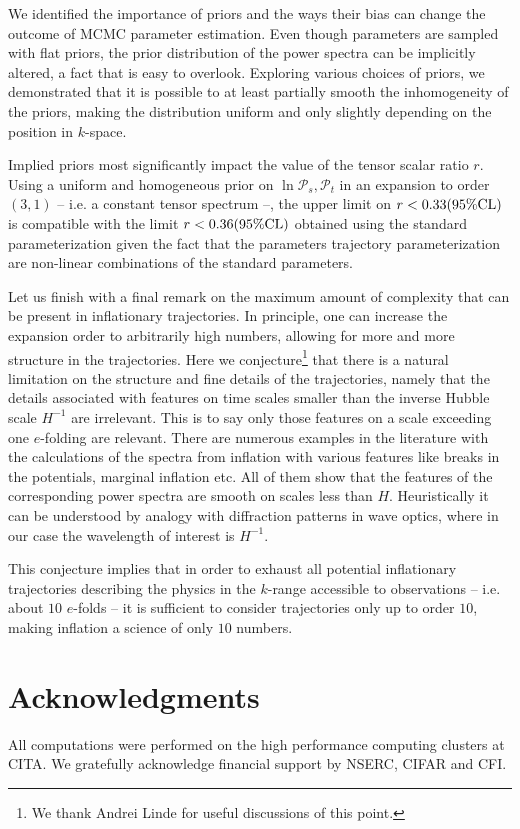 \documentclass[a4paper,11pt]{article}
\newcommand{\pscalar}{{\mathcal{P}_s}}
\newcommand{\ptensor}{{\mathcal{P}_t}}
\begin{document}
We identified the importance of priors and the ways their bias can
change the outcome of MCMC parameter estimation. Even though
parameters are sampled with flat priors, the prior distribution of the
power spectra can be implicitly altered, a fact that is easy to
overlook. Exploring various choices of priors, we demonstrated that it
is possible to at least partially smooth the inhomogeneity of the
priors, making the distribution uniform and only slightly depending on
the position in $k$-space.

Implied priors most significantly impact the value of the tensor
scalar ratio $r$. Using a uniform and homogeneous prior on
$\ln\pscalar, \ptensor $ in an expansion to order $(3,1)$ --
i.e. a constant tensor spectrum --, the upper limit on
$r<0.33(95\%{\rm CL})$ is compatible with the limit $r<0.36(95\%{\rm CL})$
obtained using the standard parameterization given the fact that the
parameters trajectory parameterization are non-linear combinations of
the standard parameters. 

Let us finish with a final remark on the maximum amount of complexity
that can be present in inflationary trajectories. In principle, one
can increase the expansion order to arbitrarily high numbers, allowing
for more and more structure in the trajectories. Here we
conjecture\footnote{We thank Andrei Linde for useful discussions of
this point.} that there is a natural limitation on the structure and
fine details of the trajectories, namely that the details associated
with features on time scales smaller than the inverse Hubble scale
$H^{-1}$ are irrelevant. This is to say only those features on a scale
exceeding one $e$-folding are relevant. There are numerous examples in
the literature with the calculations of the spectra from inflation
with various features like breaks in the potentials, marginal
inflation etc. All of them show that the features of the corresponding
power spectra are smooth on scales less than $H$. Heuristically it can
be understood by analogy with diffraction patterns in wave optics,
where in our case the wavelength of interest is $H^{-1}$.

This conjecture implies that in order to exhaust all potential
inflationary trajectories describing the physics in the $k$-range
accessible to observations -- i.e. about $10$ $e$-folds -- it is
sufficient to consider trajectories only up to order $10$, making
inflation a science of only $10$ numbers.


\section*{Acknowledgments}
All computations were performed on the high performance computing
clusters at CITA. We gratefully acknowledge financial support by
NSERC, CIFAR and CFI.
\end{document}
